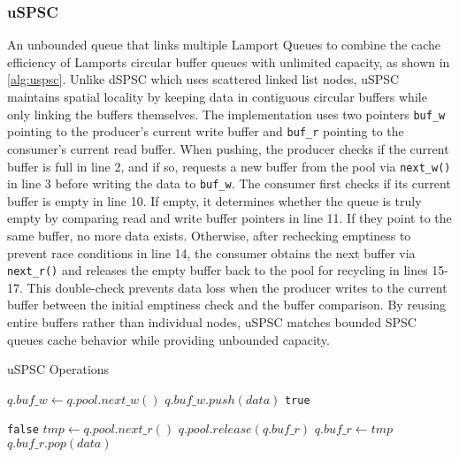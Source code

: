 \subsubsection{\acl{uSPSC}}
An unbounded queue that links multiple Lamport Queues to combine the cache efficiency of Lamports circular buffer queues with unlimited capacity, as shown in \cref{alg:uspsc}. Unlike dSPSC which uses scattered linked list nodes, uSPSC maintains spatial locality by keeping data in contiguous circular buffers while only linking the buffers themselves. The implementation uses two pointers \texttt{buf\_w} pointing to the producer's current write buffer and \texttt{buf\_r} pointing to the consumer's current read buffer. When pushing, the producer checks if the current buffer is full in line 2, and if so, requests a new buffer from the pool via \texttt{next\_w()} in line 3 before writing the data to \texttt{buf\_w}. The consumer first checks if its current buffer is empty in line 10. If empty, it determines whether the queue is truly empty by comparing read and write buffer pointers in line 11. If they point to the same buffer, no more data exists. Otherwise, after rechecking emptiness to prevent race conditions in line 14, the consumer obtains the next buffer via \texttt{next\_r()} and releases the empty buffer back to the pool for recycling in lines 15-17. This double-check prevents data loss when the producer writes to the current buffer between the initial emptiness check and the buffer comparison. By reusing entire buffers rather than individual nodes, uSPSC matches bounded \ac{SPSC} queues cache behavior while providing unbounded capacity. \cite{Aldinucci2012EfficientSync}

\begin{algorithm}[!ht]
    \centering
    \captionsetup{justification=centering}
    \caption{\acl{uSPSC} Operations\cite{Aldinucci2012EfficientSync}}
    \label{alg:uspsc}
    \scriptsize
    \begin{algorithmic}[1]
             
                \State $q.buf\_w \gets q.pool.next\_w()$ 
            \EndIf
            \State $q.buf\_w.push(data)$
            \State \Return \texttt{true}
        \EndFunction
        
        \State
        
                 
                    \State \Return \texttt{false} 
                \EndIf
                 
                    \State $tmp \gets q.pool.next\_r()$
                    \State $q.pool.release(q.buf\_r)$ 
                    \State $q.buf\_r \gets tmp$
                \EndIf
            \EndIf
            \State \Return $q.buf\_r.pop(data)$
        \EndFunction
    \end{algorithmic}
 \end{algorithm}

